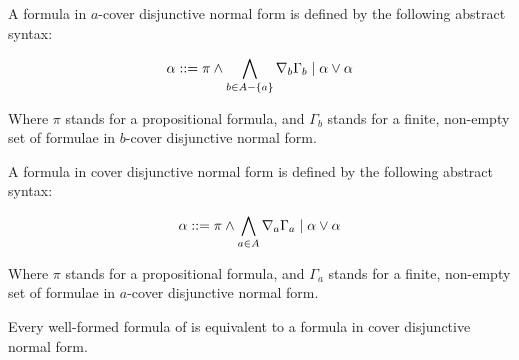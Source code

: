 \begin{definition}\label{kd45-cdnf}
A formula in $a$-cover disjunctive normal form is defined by the following
abstract syntax:

$$
\alpha ::= \pi \land \bigwedge_{b \in A - \{a\}} \nabla_b \Gamma_b \mid
\alpha \lor \alpha
$$

Where $\pi$ stands for a propositional formula, and $\Gamma_b$ stands for a
finite, non-empty set of formulae in $b$-cover disjunctive normal form.

A formula in cover disjunctive normal form is defined by the following abstract
syntax:

$$
\alpha ::= \pi \land \bigwedge_{a \in A} \nabla_a \Gamma_a \mid
\alpha \lor \alpha
$$

Where $\pi$ stands for a propositional formula, and $\Gamma_a$ stands for a
finite, non-empty set of formulae in $a$-cover disjunctive normal form.
\end{definition}

\begin{lemma}
Every well-formed formula of \logicKD{} is equivalent to a formula in
cover disjunctive normal form.
\end{lemma}

